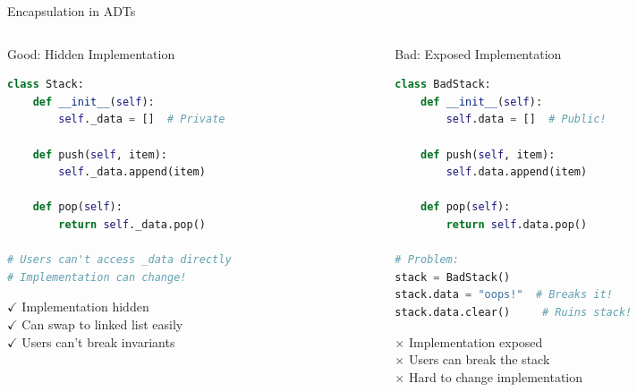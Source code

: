 \documentclass[aspectratio=169,xcolor=dvipsnames]{beamer}
\begin{document}
\begin{frame}[fragile]{Encapsulation in ADTs}
  \begin{columns}
    \begin{column}{0.48\textwidth}
      \begin{exampleblock}{Good: Hidden Implementation}
        \begin{lstlisting}[language=Python,basicstyle=\tiny\ttfamily]
class Stack:
    def __init__(self):
        self._data = []  # Private

    def push(self, item):
        self._data.append(item)

    def pop(self):
        return self._data.pop()

# Users can't access _data directly
# Implementation can change!
        \end{lstlisting}

        \vspace{0.2cm}

        {\color{green!70!black}$\checkmark$} Implementation hidden \\
        {\color{green!70!black}$\checkmark$} Can swap to linked list easily \\
        {\color{green!70!black}$\checkmark$} Users can't break invariants
      \end{exampleblock}
    \end{column}
    \begin{column}{0.48\textwidth}
      \begin{alertblock}{Bad: Exposed Implementation}
        \begin{lstlisting}[language=Python,basicstyle=\tiny\ttfamily]
class BadStack:
    def __init__(self):
        self.data = []  # Public!

    def push(self, item):
        self.data.append(item)

    def pop(self):
        return self.data.pop()

# Problem:
stack = BadStack()
stack.data = "oops!"  # Breaks it!
stack.data.clear()     # Ruins stack!
        \end{lstlisting}

        \vspace{0.2cm}

        {\color{red}$\times$} Implementation exposed \\
        {\color{red}$\times$} Users can break the stack \\
        {\color{red}$\times$} Hard to change implementation
      \end{alertblock}
    \end{column}
  \end{columns}
\end{frame}
\end{document}
